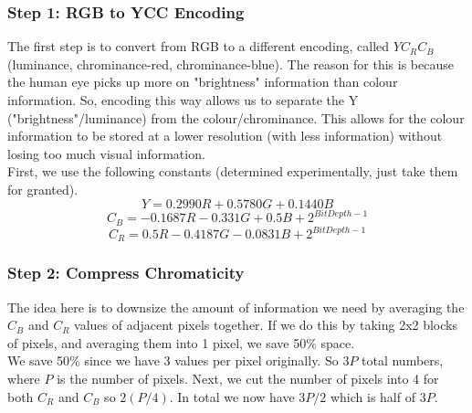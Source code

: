 \documentclass[12pt]{article}
\theoremstyle{definition}
\begin{document}
\subsubsection{Step 1: RGB to YCC Encoding}
The first step is to convert from RGB to a different encoding, called $YC_RC_B$ (luminance, chrominance-red, chrominance-blue). The reason for this is because the human eye picks up more on "brightness" information than colour information. So, encoding this way allows us to separate the Y ("brightness"/luminance) from the colour/chrominance. This allows for the colour information to be stored at a lower resolution (with less information) without losing too much visual information.
\\ \linebreak
First, we use the following constants (determined experimentally, just take them for granted). 
$$Y = 0.2990R + 0.5780G + 0.1440B$$
$$ C_B = -0.1687R - 0.331G + 0.5B + 2^{BitDepth-1}$$
$$ C_R = 0.5R - 0.4187G - 0.0831B + 2^{BitDepth-1}$$

\subsubsection{Step 2: Compress Chromaticity}
The idea here is to downsize the amount of information we need by averaging the $C_B$ and $C_R$ values of adjacent pixels together. If we do this by taking 2x2 blocks of pixels, and averaging them into 1 pixel, we save 50\% space.
\\ \linebreak
We save 50\% since we have 3 values per pixel originally. So $3P$ total numbers, where $P$ is the number of pixels. Next, we cut the number of pixels into 4 for both $C_R$ and $C_B$ so $2(P/4)$. In total we now have $3P/2$ which is half of $3P$.
\\ \linebreak
\end{document}
